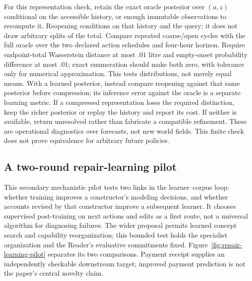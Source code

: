 \documentclass[10pt]{article}
\begin{document}
For this representation check, retain the exact oracle posterior over
$(a,z)$ conditional on the accessible history, or enough immutable
observations to recompute it. Reopening conditions on
that history and the query; it does not draw arbitrary splits of the total.
Compare repeated coarse/open cycles with the full oracle over the two declared
action schedules and four-hour horizon. Require endpoint-total Wasserstein
distance at most $.01$ litre and empty-onset probability difference at most
$.01$; exact enumeration should make both zero, with tolerance only for
numerical approximation. This tests distributions, not merely equal means.
With a learned posterior, instead compare reopening against that same
posterior before compression; its inference error against the oracle is a
separate learning metric.
If a compressed representation loses the required distinction, keep the
richer posterior or replay the history and report its cost. If neither is
available, return unresolved rather than fabricate a compatible refinement.
These are operational diagnostics over forecasts, not new world fields.
This finite check does not prove equivalence for arbitrary future policies.

\subsection{A two-round repair-learning pilot}
\label{sec:repair-pilot}

This secondary mechanistic pilot tests two links in the learner--corpus loop: whether training
improves a constructor's modeling decisions, and whether accounts revised by
that constructor improve a subsequent learner. It chooses supervised
post-training on next actions and edits as a first route, not a universal
algorithm for diagnosing failures. The wider proposal permits learned
concept search and capability reorganization; this bounded test holds the
specialist organization and the Reader's evaluative commitments fixed.
Figure~\ref{fig:repair-learning-pilot} separates its two comparisons. Payment
receipt supplies an independently checkable downstream target; improved
payment prediction is not the paper's central novelty claim.
\end{document}

